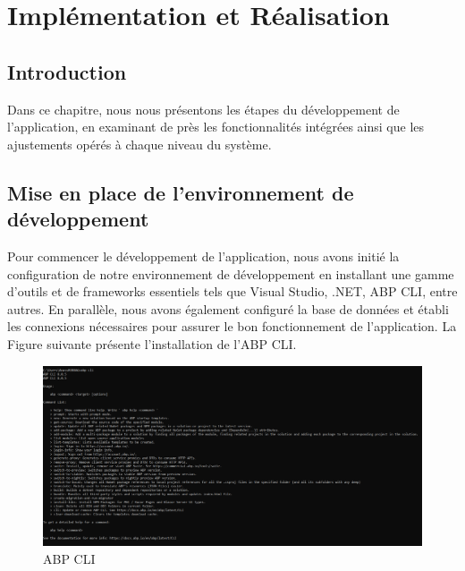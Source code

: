 


\chapter{Implémentation et Réalisation}
\label{chap:Chapter 4 title}
\section*{Introduction}

Dans ce chapitre, nous nous présentons les étapes du développement de l'application, en examinant de près les fonctionnalités intégrées ainsi que les ajustements opérés à chaque niveau du système.



\pagebreak

\section{Mise en place de l'environnement de développement}

\hspace{\parindent}Pour commencer le développement de l'application, nous avons initié la configuration de notre environnement de développement en installant une gamme d'outils et de frameworks essentiels tels que Visual Studio, .NET, ABP CLI, entre autres. En parallèle, nous avons également configuré la base de données et établi les connexions nécessaires pour assurer le bon fonctionnement de l'application. La Figure suivante présente l'installation de l'ABP CLI.

\begin{figure}[H] 
    \centering
    \includegraphics[width=17cm]{Figures/abp cli.PNG}
        \caption{ABP CLI}
\end{figure}

